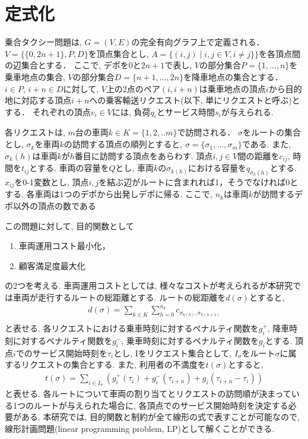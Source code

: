 \chapter{定式化}\label{formulation}
乗合タクシー問題は, $G = (V, E)$の完全有向グラフ上で定義される．$V =\{\{0,2n+1\},P,D\}$を頂点集合とし, $A = \{(i,j) \mid i,j\in V ,i \neq j\}\}$を各頂点間の辺集合とする．
ここで, デポを$0$と$2n+1$で表し, $V$の部分集合$P =\{1,...,n \}$を乗車地点の集合, $V$の部分集合$D =\{n+1,...,2n \}$を降車地点の集合とする．
$i \in P$, $i+n \in D$に対して, $V$上の2点のペア$(i,i+n)$は乗車地点の頂点$i$から目的地に対応する頂点$i+n$への乗客輸送リクエスト(以下, 単にリクエストと呼ぶ)とする．
それぞれの頂点$v_i \in V$には, 負荷$q_i$とサービス時間$s_i$が与えられる.

各リクエストは, $m$台の車両$k \in K = \{1,2,..m\}$で訪問される．
$\sigma$をルートの集合とし, $\sigma_k$を車両$k$の訪問する頂点の順列とすると, $\sigma = \{\sigma_1,...,\sigma_m\}$である. また, $\sigma_k(h)$は車両$k$が$h$番目に訪問する頂点をあらわす.
頂点$i,j \in V$間の距離を$c_{ij}$, 時間を$t_{ij}$とする.
車両の容量を$Q$とし, 車両$k$の$\sigma _{k(h)}$における容量を$q_{\sigma_k(h)}$とする.
$x_{ij}$を0-1変数とし, 頂点$i,j$を結ぶ辺がルートに含まれれば1，そうでなければ0とする.
各車両は1つのデポから出発しデポに帰る. ここで, $n_k$は車両$k$が訪問するデポ以外の頂点の数である

この問題に対して, 目的関数として
\begin{enumerate}
 \item 車両運用コスト最小化，
 \item 顧客満足度最大化
\end{enumerate}
の2つを考える. 車両運用コストとしては, 様々なコストが考えられるが本研究では車両が走行するルートの総距離とする. ルートの総距離を$d(\sigma)$とすると,
\begin{align*}
d(\sigma) = \sum_ {k\in K} \sum_{h=0}^{n_k} c_ {\sigma_{k(h)},\sigma_ {k(h+1)} }\\
\end{align*}
と表せる.
各リクエストにおける乗車時刻に対するペナルティ関数を$g^+_i$, 降車時刻に対するペナルティ関数を$g^-_i$, 乗車時刻に対するペナルティ関数を$g_i$とする.
頂点$i$でのサービス開始時刻を$\tau_i$とし, Iをリクエスト集合として, $I_\sigma$をルート$\sigma$に属するリクエストの集合とする.
また, 利用者の不満度を$t(\sigma)$とすると,
\begin{align*}
t(\sigma) = \sum_ {i \in I_\sigma} (g^+_i(\tau_i)+g^-_i(\tau_{i+n})+g_i(\tau_{i+n}-\tau_i))
\end{align*}
と表せる. 各ルートについて車両の割り当てとリクエストの訪問順が決まっている1つのルートが与えられた場合に, 各頂点でのサービス開始時刻を決定する必要がある. 本研究では, 目的関数と制約が全て線形の式で表すことが可能なので, 線形計画問題(linear programming problem, LP)として解くことができる.


